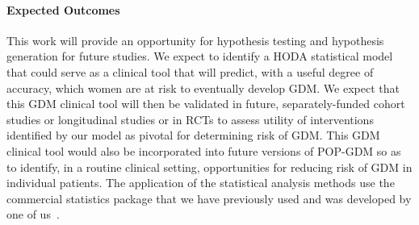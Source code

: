 \paragraph{Expected Outcomes} This work will provide an opportunity
for hypothesis testing and hypothesis generation for future
studies. We expect to identify a HODA statistical model that could
serve as a clinical tool that will predict, with a useful degree of
accuracy, which women are at risk to eventually develop GDM. We expect
that this GDM clinical tool will then be validated in future,
separately-funded cohort studies or longitudinal studies or in RCTs to
assess utility of interventions identified by our model as pivotal for
determining risk of GDM. This GDM clinical tool would also be
incorporated into future versions of POP-GDM so as to identify, in a
routine clinical setting, opportunities for reducing risk of GDM in
individual patients. The application of the statistical analysis
methods use the commercial statistics package that we have previously
used and was developed by one of us~\citep{Yarnold2004}.

